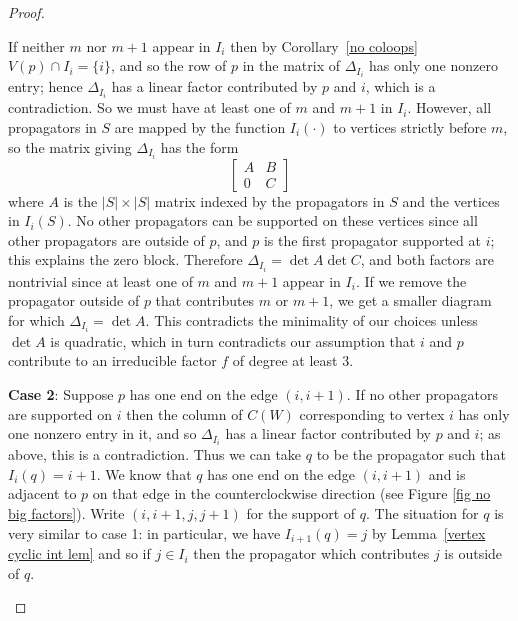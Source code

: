 \documentclass[11pt]{article}
\theoremstyle{remark}
\theoremstyle{definition}
\begin{document}
\begin{proof}
\begin{enumerate}
If neither $m$ nor $m+1$ appear in $I_i$ then by Corollary~\ref{no coloops} $V(p) \cap I_i = \{i\}$, and so the row of $p$ in the matrix of $\Delta_{I_i}$ has only one nonzero entry; hence $\Delta_{I_i}$ has a linear factor contributed by $p$ and $i$, which is a contradiction.  So we must have at least one of $m$ and $m+1$ in $I_i$.  However, all propagators in $S$ are mapped by the function $I_{i}(\cdot)$ to vertices strictly before $m$, so the matrix giving $\Delta_{I_i}$ has the form
\[
\begin{bmatrix} A & B \\ 0 & C\end{bmatrix}
\]
where $A$ is the $|S|\times |S|$ matrix indexed by the propagators in $S$ and the vertices in $I_i(S)$. No other propagators can be supported on these vertices since all other propagators are outside of $p$, and $p$ is the first propagator supported at $i$; this explains the zero block.  Therefore $\Delta_{I_i} = \det A \det C$, and both factors are nontrivial since at least one of $m$ and $m+1$ appear in $I_i$.  If we remove the propagator outside of $p$ that contributes $m$ or $m+1$, we get a smaller diagram for which $\Delta_{I_i} = \det A$. This contradicts the minimality of our choices unless $\det A$ is quadratic, which in turn contradicts our assumption that $i$ and $p$ contribute to an irreducible factor $f$ of degree at least 3.

\textbf{Case 2}: Suppose $p$ has one end on the edge $(i, i+1)$.  If no other propagators are supported on $i$ then the column of $C(W)$ corresponding to vertex $i$ has only one nonzero entry in it, and so $\Delta_{I_i}$ has a linear factor contributed by $p$ and $i$; as above, this is a contradiction.  Thus we can take $q$ to be the propagator such that $I_i(q)=i+1$. We know that $q$ has one end on the edge $(i, i+1)$ and is adjacent to $p$ on that edge in the counterclockwise direction (see Figure \ref{fig no big factors}).  Write $(i, i+1, j, j+1)$ for the support of $q$.  The situation for $q$ is very similar to case 1: in particular, we have $I_{i+1}(q) = j$ by Lemma~\ref{vertex cyclic int lem} and so if $j\in I_i$ then the propagator which contributes $j$ is outside of $q$.  


\end{enumerate}
\end{proof}
\end{document}
